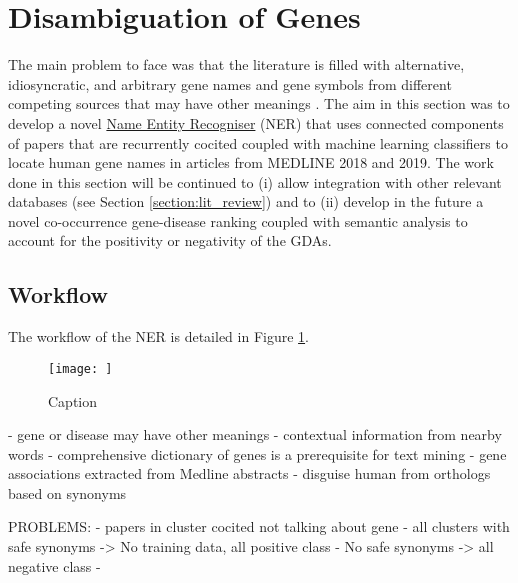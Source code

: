 \section{Disambiguation of Genes}
\label{section:disambiguation}
The main problem to face was that the literature is filled with alternative, idiosyncratic, and arbitrary gene names and gene symbols from different competing sources that may have other meanings \cite{gad2004,brown2018}. The aim in this section was to develop a novel \href{https://en.wikipedia.org/wiki/Named-entity_recognition}{Name Entity Recogniser} (NER) that uses connected components of papers that are recurrently cocited coupled with machine learning classifiers to locate human gene names in articles from MEDLINE 2018 and 2019. The work done in this section will be continued to (i) allow integration with other relevant databases (see Section \ref{section:lit_review}) and to (ii) develop in the future a novel co-occurrence gene-disease ranking coupled with semantic analysis to account for the positivity or negativity of the GDAs.

\subsection{Workflow}
The workflow of the NER is detailed in Figure \ref{fig:NER_workflow}.
\begin{figure}
    \centering
    \texttt{[image: ]}
    \caption{Caption}
    \label{fig:NER_workflow}
\end{figure}

 - gene or disease may have other meanings
 - contextual information from nearby words
 - comprehensive dictionary of genes is a prerequisite for text mining
 - gene associations extracted from Medline abstracts
 - disguise human from orthologs based on synonyms
 
PROBLEMS:
- papers in cluster cocited not talking about gene
- all clusters with safe synonyms -> No training data, all positive class
- No safe synonyms -> all negative class
- 